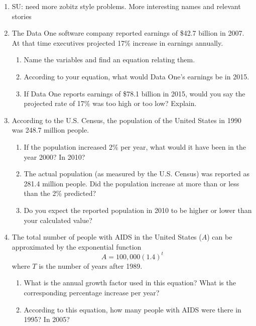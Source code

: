 \begin{enumerate}
\item SU:  need more zobitz style problems.  More interesting names and relevant stories

\item The Data One software company reported earnings of \$42.7 billion in 2007.  At that time executives projected 17\% increase in earnings annually.
\begin{enumerate}
\item Name the variables and find an equation relating them.
\item According to your equation, what would Data One's earnings be in 2015.
\item If Data One reports earnings of \$78.1 billion in 2015, would you say the projected rate of 17\% was too high or too low?  Explain.
\end{enumerate}

\item According to the U.S. Census, the population of the United States in 1990 was 248.7 million people.
\begin{enumerate}
\item If the population increased 2\% per year, what would it have been in the year 2000?  In 2010?
\item The actual population (as measured by the U.S. Census) was reported as 281.4 million people.  Did the population increase at more than or less than the 2\% predicted?  
\item Do you expect the reported population in 2010 to be higher or lower than your calculated value?
\end{enumerate}

\item The total number of people with AIDS in the United States ($A$) can be approximated by the exponential function $$A=100,000(1.4)^t$$ where $T$ is the number of years after 1989.
\begin{enumerate}
\item What is the annual growth factor used in this equation?  What is the corresponding percentage increase per year?
\item According to this equation, how many people with AIDS were there in 1995?  In 2005?
\end{enumerate}


\end{enumerate}
